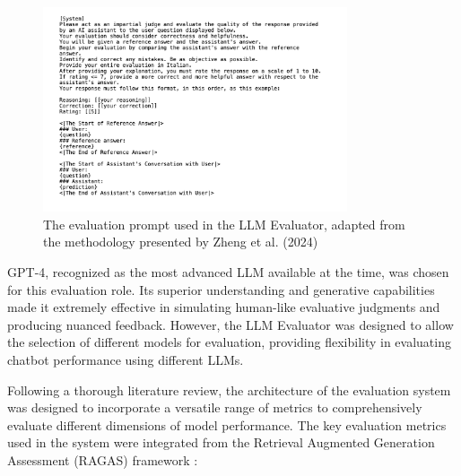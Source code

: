 \begin{figure}[h!]
    \centering
    \includegraphics[width=0.8\textwidth]{images/llme/llme-prompt.png}
    \caption{The evaluation prompt used in the LLM Evaluator, adapted from the methodology presented by Zheng et al. (2024) \cite{zheng2024judging}}
    \label{fig:llme-prompt}
\end{figure}

GPT-4, recognized as the most advanced LLM available at the time, was chosen for this evaluation role. Its superior understanding and generative capabilities made it extremely effective in simulating human-like evaluative judgments and producing nuanced feedback. However, the LLM Evaluator was designed to allow the selection of different models for evaluation, providing flexibility in evaluating chatbot performance using different LLMs.

Following a thorough literature review, the architecture of the evaluation system was designed to incorporate a versatile range of metrics to comprehensively evaluate different dimensions of model performance. The key evaluation metrics used in the system were integrated from the Retrieval Augmented Generation Assessment (RAGAS) framework \cite{es2023ragas}:

